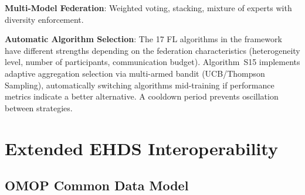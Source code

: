 \documentclass[conference,a4paper]{IEEEtran}
\begin{document}
\textbf{Multi-Model Federation}: Weighted voting, stacking, mixture of experts with diversity enforcement.

\textbf{Automatic Algorithm Selection}: The 17 FL algorithms in the framework have different strengths depending on the federation characteristics (heterogeneity level, number of participants, communication budget). Algorithm~S15 implements adaptive aggregation selection via multi-armed bandit (UCB/Thompson Sampling), automatically switching algorithms mid-training if performance metrics indicate a better alternative. A cooldown period prevents oscillation between strategies.

\begin{figure}[htbp]
\centering
{}
\end{figure}

\section{Extended EHDS Interoperability}
\label{sec:interop}

\subsection{OMOP Common Data Model}
\end{document}

